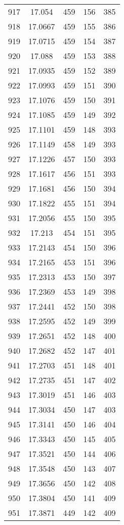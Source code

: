 \documentclass[12pt,a4paper]{article}
\begin{document}
\begin{tabular}{r|cccc}
	917 & 17.054 & 459 & 156 & 385 \\
	918 & 17.0667 & 459 & 155 & 386 \\
	919 & 17.0715 & 459 & 154 & 387 \\
	920 & 17.088 & 459 & 153 & 388 \\
	921 & 17.0935 & 459 & 152 & 389 \\
	922 & 17.0993 & 459 & 151 & 390 \\
	923 & 17.1076 & 459 & 150 & 391 \\
	924 & 17.1085 & 459 & 149 & 392 \\
	925 & 17.1101 & 459 & 148 & 393 \\
	926 & 17.1149 & 458 & 149 & 393 \\
	927 & 17.1226 & 457 & 150 & 393 \\
	928 & 17.1617 & 456 & 151 & 393 \\
	929 & 17.1681 & 456 & 150 & 394 \\
	930 & 17.1822 & 455 & 151 & 394 \\
	931 & 17.2056 & 455 & 150 & 395 \\
	932 & 17.213 & 454 & 151 & 395 \\
	933 & 17.2143 & 454 & 150 & 396 \\
	934 & 17.2165 & 453 & 151 & 396 \\
	935 & 17.2313 & 453 & 150 & 397 \\
	936 & 17.2369 & 453 & 149 & 398 \\
	937 & 17.2441 & 452 & 150 & 398 \\
	938 & 17.2595 & 452 & 149 & 399 \\
	939 & 17.2651 & 452 & 148 & 400 \\
	940 & 17.2682 & 452 & 147 & 401 \\
	941 & 17.2703 & 451 & 148 & 401 \\
	942 & 17.2735 & 451 & 147 & 402 \\
	943 & 17.3019 & 451 & 146 & 403 \\
	944 & 17.3034 & 450 & 147 & 403 \\
	945 & 17.3141 & 450 & 146 & 404 \\
	946 & 17.3343 & 450 & 145 & 405 \\
	947 & 17.3521 & 450 & 144 & 406 \\
	948 & 17.3548 & 450 & 143 & 407 \\
	949 & 17.3656 & 450 & 142 & 408 \\
	950 & 17.3804 & 450 & 141 & 409 \\
	951 & 17.3871 & 449 & 142 & 409 \\

\end{tabular}
\end{document}
